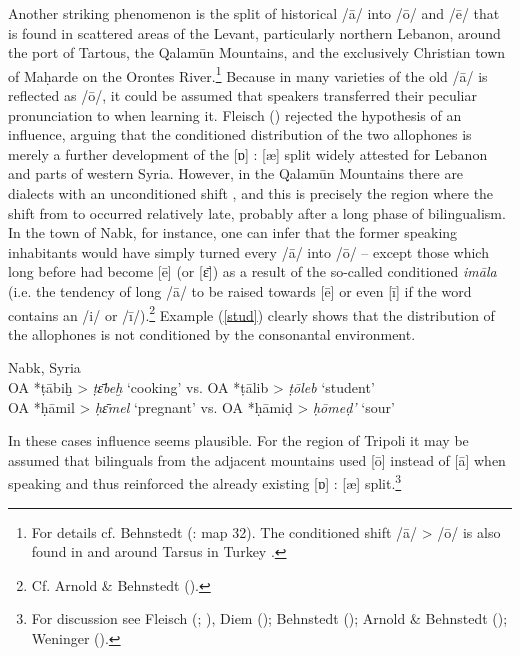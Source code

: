 \documentclass[output=paper]{langsci/langscibook}
\begin{document}
Another striking phenomenon is the split of historical /ā/ into /ō/ and /ē/ that is found in scattered areas of the Levant, particularly northern Lebanon, around the  port of Tartous, the Qalamūn Mountains, and the exclusively Christian town of Maḥarde on the Orontes River.\footnote{For details cf. Behnstedt (\citeyear{Behnstedt1997}: map 32). The conditioned shift /ā/ > /ō/ is also found in and around Tarsus in Turkey \citep[37--38]{Procházka2002Cukurova}.} Because in many varieties of  the old  /ā/ is reflected as /ō/, it could be assumed that  speakers transferred their peculiar pronunciation to  when learning it. Fleisch (\citeyear[49]{Fleisch1974vowels}) rejected the hypothesis of an  influence, arguing that the conditioned distribution of the two allophones is merely a further development of the [ɒ] : [æ] split widely attested for Lebanon and parts of western Syria. However, in the  Qalamūn Mountains there are dialects with an unconditioned shift \citep{Behnstedt1992}, and this is precisely the region where the shift from  to  occurred relatively late, probably after a long phase of {bilingualism}. In the town of Nabk, for instance, one can infer that the former  speaking inhabitants would have simply turned every /ā/ into /ō/ – except those which long before had become [ē] (or [ɛ̄]) as a result of the so-called conditioned \textit{imāla} (i.e. the tendency of long /ā/ to be raised towards [ē] or even [ī] if the word contains an /i/ or /ī/).\footnote{Cf. Arnold \& Behnstedt (\citeyear[68]{ArnoldBehnstedt1993}).} Example (\ref{stud}) clearly shows that the distribution of the allophones is not conditioned by the consonantal environment.

\ea \label{stud}
{Nabk, Syria \citep[20]{Gralla2006}} \\
    \textup{OA} *ṭābiḫ > \textit{ṭɛ̄beḫ}  \textup{‘cooking’ vs. OA} *ṭālib > \textit{ṭōleb}  \textup{‘student’}\\
\textup{OA} *ḥāmil > \textit{ḥɛ̄mel} \textup{‘pregnant’ vs. OA} *ḥāmiḍ > \textit{ḥōmeḍ’} \textup{‘sour’}\\
\z

In these cases  influence seems plausible. For the region of Tripoli it may be assumed that  bilinguals from the adjacent mountains used [ō] instead of [ā] when speaking  and thus reinforced the already existing [ɒ] : [æ] split.\footnote{For discussion see Fleisch (\citeyear[48--50]{Fleisch1974vowels}; \citeyear[133--136]{Fleisch1974Kfar}), Diem (\citeyear[45--46]{Diem1979}); Behnstedt (\citeyear{Behnstedt1992}); Arnold \& Behnstedt (\citeyear[67--68]{ArnoldBehnstedt1993}); Weninger (\citeyear[748]{Weninger2011Aramaic}).}
\end{document}
